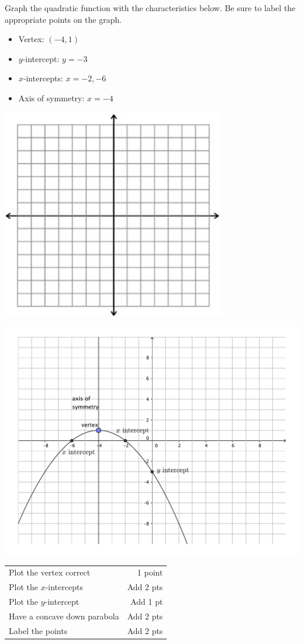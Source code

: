 {
	Graph the quadratic function with the characteristics below.  Be sure to label the appropriate points on the graph.
	\begin{itemize}
	\item	Vertex: $(-4,1)$  
	\item $y$-intercept: $y=-3$ 
	\item $x$-intercepts: $x=-2,-6$
	\item Axis of symmetry: $x=-4$
	\end{itemize}
	\begin{onlyproblem}\begin{center}\includegraphics{fig-graphpaper.png}\end{center}\end{onlyproblem} \begin{onlysolution}\begin{center}\includegraphics{fig100-18_5-a-answer}\end{center}\end{onlysolution}}
{
	\begin{tabular}{l r}
	Plot the vertex correct&1 point\\
	Plot the $x$-intercepts& Add 2 pts\\
	Plot the $y$-intercept & Add 1 pt\\
	Have a concave down parabola&Add 2 pts\\
	Label the points&Add 2 pts
	\end{tabular}
}


